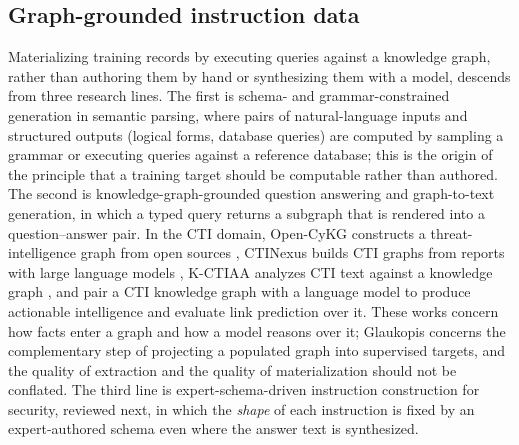 \documentclass[a4paper,fleqn]{cas-dc}
\begin{document}
\subsection{Graph-grounded instruction data}\label{sec:bg-graph}
Materializing training records by executing queries against a knowledge graph, rather than authoring them by hand or synthesizing them with a model, descends from three research lines. The first is schema- and grammar-constrained generation in semantic parsing, where pairs of natural-language inputs and structured outputs (logical forms, database queries) are computed by sampling a grammar or executing queries against a reference database; this is the origin of the principle that a training target should be computable rather than authored. The second is knowledge-graph-grounded question answering and graph-to-text generation, in which a typed query returns a subgraph that is rendered into a question--answer pair. In the CTI domain, Open-CyKG constructs a threat-intelligence graph from open sources \citep{sarhan2021opencykg}, CTINexus builds CTI graphs from reports with large language models \citep{cheng2024ctinexus}, K-CTIAA analyzes CTI text against a knowledge graph \citep{li2023kctiaa}, and \citet{fieblinger2024actionable} pair a CTI knowledge graph with a language model to produce actionable intelligence and evaluate link prediction over it. These works concern how facts enter a graph and how a model reasons over it; Glaukopis concerns the complementary step of projecting a populated graph into supervised targets, and the quality of extraction and the quality of materialization should not be conflated. The third line is expert-schema-driven instruction construction for security, reviewed next, in which the \emph{shape} of each instruction is fixed by an expert-authored schema even where the answer text is synthesized.
\end{document}
